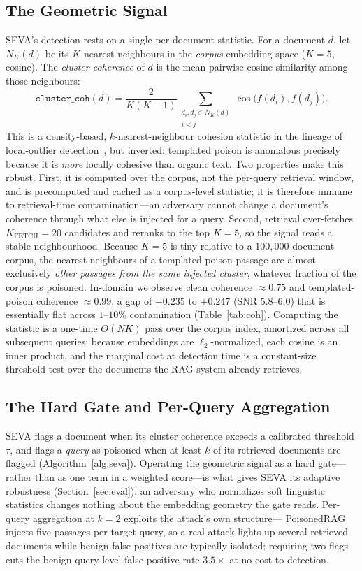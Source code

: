 \documentclass[conference]{IEEEtran}
\begin{document}
\subsection{The Geometric Signal}
SEVA's detection rests on a single per-document statistic. For a document $d$,
let $N_K(d)$ be its $K$ nearest neighbours in the \emph{corpus} embedding space
($K=5$, cosine). The \emph{cluster coherence} of $d$ is the mean pairwise cosine
similarity among those neighbours:
\[
\texttt{cluster\_coh}(d) = \frac{2}{K(K-1)}
\sum_{\substack{d_i,d_j \in N_K(d)\\ i<j}} \cos\!\big(f(d_i),f(d_j)\big).
\]
This is a density-based, $k$-nearest-neighbour cohesion statistic in the lineage of
local-outlier detection~\cite{lof}, but inverted: templated poison is anomalous
precisely because it is \emph{more} locally cohesive than organic text.
Two properties make this robust. First, it is computed over the corpus, not the
per-query retrieval window, and is precomputed and cached as a corpus-level
statistic; it is therefore immune to retrieval-time contamination---an adversary
cannot change a document's coherence through what else is injected for a query.
Second, retrieval over-fetches $K_{\mathrm{FETCH}}=20$ candidates and reranks to
the top $K=5$, so the signal reads a stable neighbourhood. Because $K=5$ is tiny
relative to a $100{,}000$-document corpus, the nearest neighbours of a templated
poison passage are almost exclusively \emph{other passages from the same injected
cluster}, whatever fraction of the corpus is poisoned. In-domain we observe clean
coherence $\approx 0.75$ and templated-poison coherence $\approx 0.99$, a gap of
$+0.235$ to $+0.247$ (SNR $5.8$--$6.0$) that is essentially flat across $1$--$10\%$
contamination (Table~\ref{tab:coh}).
Computing the statistic is a one-time $O(NK)$ pass over the corpus index, amortized
across all subsequent queries; because embeddings are $\ell_2$-normalized, each
cosine is an inner product, and the marginal cost at detection time is a
constant-size threshold test over the documents the RAG system already retrieves.

\subsection{The Hard Gate and Per-Query Aggregation}
SEVA flags a document when its cluster coherence exceeds a calibrated threshold
$\tau$, and flags a \emph{query} as poisoned when at least $k$ of its retrieved
documents are flagged (Algorithm~\ref{alg:seva}). Operating the geometric signal
as a hard gate---rather than as one term in a weighted score---is what gives SEVA
its adaptive robustness (Section~\ref{sec:eval}): an adversary who normalizes soft
linguistic statistics changes nothing about the embedding geometry the gate
reads. Per-query aggregation at $k=2$ exploits the attack's own structure---%
PoisonedRAG injects five passages per target query, so a real attack
lights up several retrieved documents while benign false positives are typically
isolated; requiring two flags cuts the benign query-level false-positive rate
$3.5\times$ at no cost to detection.
\end{document}
